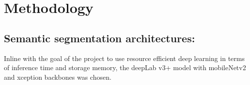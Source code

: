\chapter{Methodology}


\section{Semantic segmentation architectures:}
Inline with the goal of the project to use resource efficient deep learning in terms of inference time and storage memory, the deepLab v3+ model with mobileNetv2 and xception backbones was chosen. 